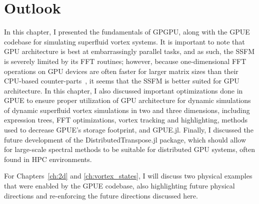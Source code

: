 \section{Outlook}

In this chapter, I presented the fundamentals of GPGPU, along with the GPUE codebase for simulating superfluid vortex systems.
It is important to note that GPU architecture is best at embarrassingly parallel tasks, and as such, the SSFM is severely limited by its FFT routines; however, because one-dimensional FFT operations on GPU devices are often faster for larger matrix sizes than their CPU-based counter-parts~\cite{merz2016}, it seems that the SSFM is better suited for GPU architecture.
In this chapter, I also discussed important optimizations done in GPUE to ensure proper utilization of GPU architecture for dynamic simulations of dynamic superfluid vortex simulations in two and three dimensions, including expression trees, FFT optimizations, vortex tracking and highlighting, methods used to decrease GPUE's storage footprint, and GPUE.jl.
Finally, I discussed the future development of the DistributedTranspose.jl package, which should allow for large-scale spectral methods to be suitable for distributed GPU systems, often found in HPC environments.

For Chapters~\ref{ch:2d} and \ref{ch:vortex_states}, I will discuss two physical examples that were enabled by the GPUE codebase, also highlighting future physical directions and re-enforcing the future directions discussed here.
